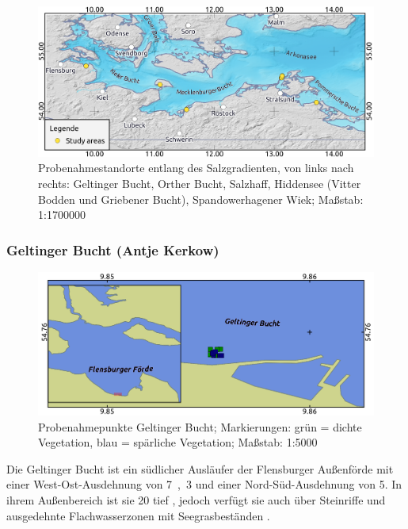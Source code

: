 \begin{figure}[htb]
\centering
\includegraphics[width=1\textwidth]{images/Uebersicht.png}
\caption[Übersichtskarte der Probenahmestandorte entlang des Salzgradienten]{Probenahmestandorte entlang des Salzgradienten, von links nach rechts: Geltinger Bucht, Orther Bucht, Salzhaff, Hiddensee (Vitter Bodden und Griebener Bucht), Spandowerhagener Wiek; Maßstab: 1:1700000}
\label{Uebersicht}
\end{figure}




\subsubsection{Geltinger Bucht (Antje Kerkow)}


\begin{figure}[htb]
\centering
\includegraphics[width=1\textwidth]{images/GB.png}
\caption[Probenahmepunkte Geltinger Bucht]{Probenahmepunkte Geltinger Bucht; Markierungen: grün = dichte Vegetation, blau = spärliche Vegetation; Maßstab: 1:5000}
\label{GB}
\end{figure}


Die Geltinger Bucht ist ein südlicher Ausläufer der Flensburger Außenförde mit einer West-Ost-Ausdehnung von \unit{7,3}{\kilo\metre} und einer Nord-Süd-Ausdehnung von \unit{5}{\kilo\metre}. In ihrem Außenbereich ist sie \unit{20}{\metre} tief \citep{nikulina_2009}, jedoch verfügt sie auch über Steinriffe und ausgedehnte Flachwasserzonen mit Seegrasbeständen \citep{landesbetrieb_fur_kustenschutz_nationalpark_und_meeresschutz_schleswig-holstein_2013}.

